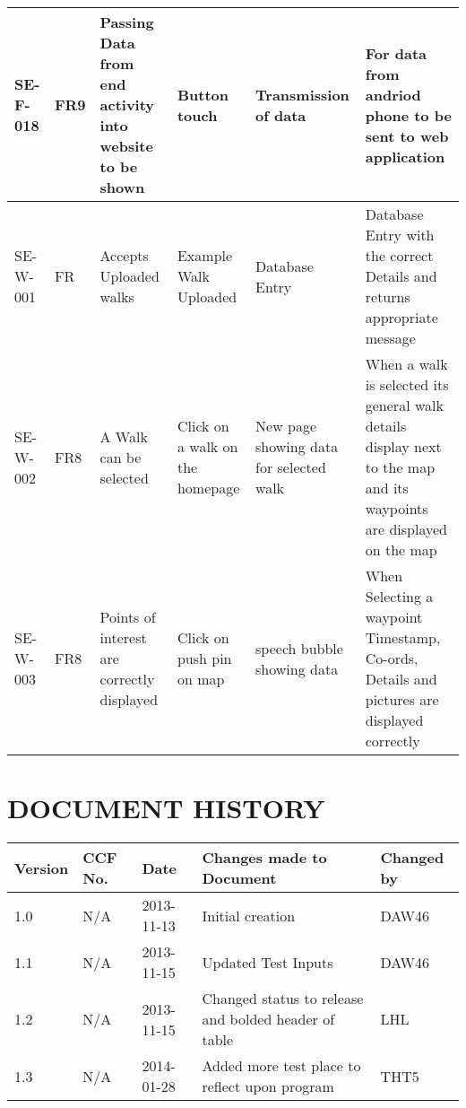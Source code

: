 \documentclass{project}
\begin{document}
\begin{longtable}{ | p{1cm} | p{1cm} | p{2.5cm} | p{2.5cm} | p{2.5cm} | p{2.5cm} |}
SE-F-018
& FR9
& Passing Data from end activity into website to be shown
& Button touch
& Transmission of data
& For data from andriod phone to be sent to web application  \\ \hline

SE-W-001
& FR
& Accepts Uploaded walks
& Example Walk Uploaded
& Database Entry
& Database Entry with the correct Details and returns appropriate message
\\ \hline

SE-W-002
& FR8
& A Walk can be selected
& Click on a walk on the homepage
& New page showing data for selected walk
& When a walk is selected its general walk details display next to the 
map and its waypoints are displayed on the map
\\ \hline

SE-W-003
& FR8
& Points of interest are correctly displayed
& Click on push pin on map
& speech bubble showing data
& When Selecting a waypoint Timestamp, Co-ords, Details and pictures
are displayed correctly\\ \hline




\end{longtable}






\section*{DOCUMENT HISTORY}
\begin{flushleft}
\begin{tabular}{ | p{1.5cm} | p{1cm} | p{2cm} | p{6cm}| p{1.5cm}| }
\hline
Version & CCF No. & Date & Changes made to Document & Changed by \\
\hline

1.0 & N/A & 2013-11-13 & Initial creation & DAW46 \\ \hline
1.1 & N/A & 2013-11-15 & Updated Test Inputs & DAW46 \\ \hline
1.2 & N/A & 2013-11-15 & Changed status to release and bolded header of table & LHL \\ \hline
1.3 & N/A & 2014-01-28 & Added more test place to reflect upon program & THT5 \\ \hline

\end{tabular}
\end{flushleft}
\label{thelastpage}
\end{document}
